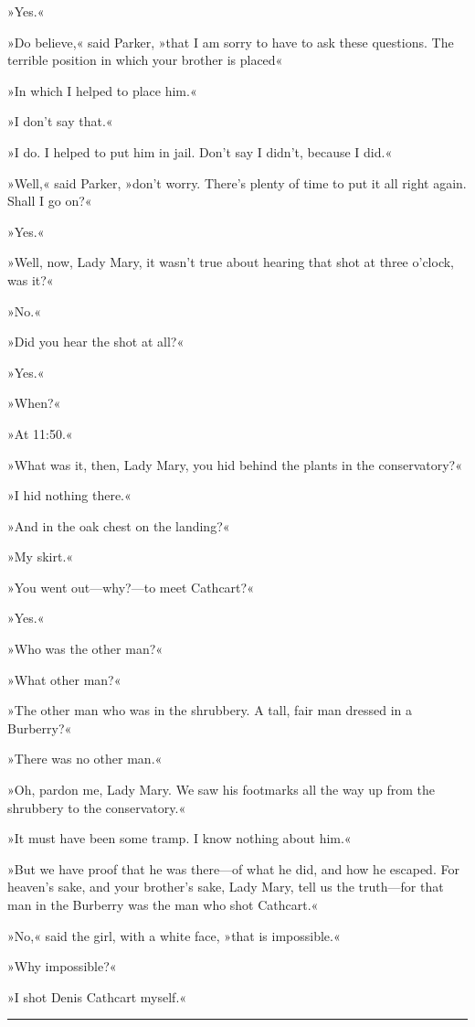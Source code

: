 »Yes.«

»Do believe,« said Parker, »that I am sorry to have to ask these questions. The terrible position in which your brother is placed\longdash«

»In which I helped to place him.«

»I don't say that.«

»I do. I helped to put him in jail. Don't say I didn't, because I did.«

»Well,« said Parker, »don't worry. There's plenty of time to put it all right again. Shall I go on?«

»Yes.«

»Well, now, Lady Mary, it wasn't true about hearing that shot at three o'clock, was it?«

»No.«

»Did you hear the shot at all?«

»Yes.«

»When?«

»At 11:50.«

»What was it, then, Lady Mary, you hid behind the plants in the conservatory?«

»I hid nothing there.«

»And in the oak chest on the landing?«

»My skirt.«

»You went out—why?—to meet Cathcart?«

»Yes.«

»Who was the other man?«

»What other man?«

»The other man who was in the shrubbery. A tall, fair man dressed in a Burberry?«

»There was no other man.«

»Oh, pardon me, Lady Mary. We saw his footmarks all the way up from the shrubbery to the conservatory.«

»It must have been some tramp. I know nothing about him.«

»But we have proof that he was there—of what he did, and how he escaped. For heaven's sake, and your brother's sake, Lady Mary, tell us the truth—for that man in the Burberry was the man who shot Cathcart.«

»No,« said the girl, with a white face, »that is impossible.«

»Why impossible?«

»I shot Denis Cathcart myself.«

\noindent\hfil\rule{0.5\textwidth}{.4pt}\hfil

